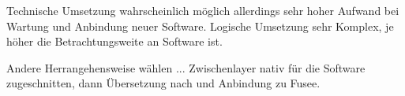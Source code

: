 
Technische Umsetzung wahrscheinlich möglich allerdings sehr hoher Aufwand bei Wartung und Anbindung neuer Software.
Logische Umsetzung sehr Komplex, je höher die Betrachtungsweite an Software ist.

Andere Herrangehensweise wählen ... Zwischenlayer nativ für die Software zugeschnitten, dann Übersetzung nach \cs und Anbindung zu Fusee.